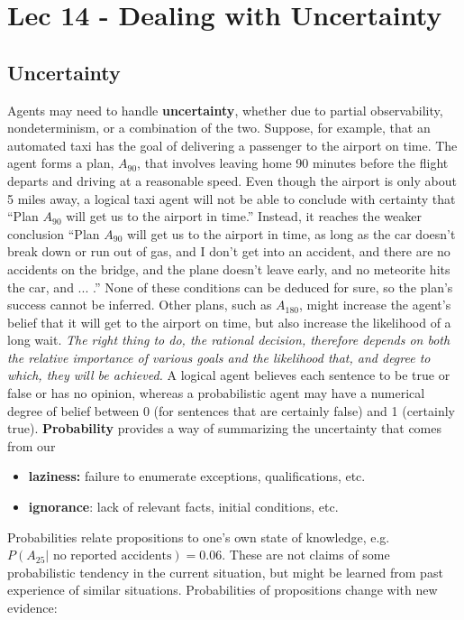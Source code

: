 \chapter{Lec 14 - Dealing with Uncertainty}
\section{Uncertainty}
Agents may need to handle \textbf{uncertainty}, whether due to partial observability, nondeterminism, or a combination of the two. Suppose, for example, that an automated taxi has the goal of delivering a passenger to the airport on time. The agent forms a plan, $A_{90}$, that involves leaving home 90
minutes before the flight departs and driving at a reasonable speed. Even though the airport is only about 5 miles away, a logical taxi agent will not be able to conclude with certainty that “Plan $A_{90}$ will get us to the airport in time.” Instead, it reaches the weaker conclusion “Plan $A_{90}$ will get us to the airport in time, as long as the car doesn’t break down or run out of gas, and I don’t get into an accident, and there are no accidents on the bridge, and the plane doesn’t leave early, and no meteorite hits the car, and ... .”  None of these conditions can be deduced for sure, so the plan’s success cannot be inferred. Other plans, such as $A_{180}$, might increase the agent’s belief that it will get to the airport on
time, but also increase the likelihood of a long wait. \textit{The right thing to do, the rational decision, therefore depends on both the relative importance of various goals and the likelihood that, and degree to which, they will be achieved.}
\newline\newline
A logical agent believes each sentence to be true or false or has no opinion, whereas a probabilistic agent may have a numerical degree of belief between 0 (for sentences that are certainly false) and 1 (certainly true). \textbf{Probability} provides a way of summarizing the uncertainty that comes from our
\begin{itemize}
    \item \textbf{laziness:}  failure to enumerate exceptions, qualifications, etc.
    \item \textbf{ignorance}: lack of relevant facts, initial conditions, etc.
\end{itemize}
Probabilities relate propositions to one’s own state of knowledge, e.g. $P(A_{25}|\,\, \text{no reported accidents}) = 0.06$. These are not claims of some probabilistic tendency in the current situation, but might be learned from past experience of similar situations. Probabilities of propositions change with new evidence: 
